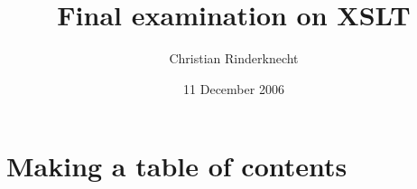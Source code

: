 \documentclass[11pt,a4paper]{article}
\title{Final examination on XSLT}
\author{Christian Rinderknecht}
\date{11 December 2006}
\begin{document}
\maketitle

\section{Making a table of contents}


\end{document}
